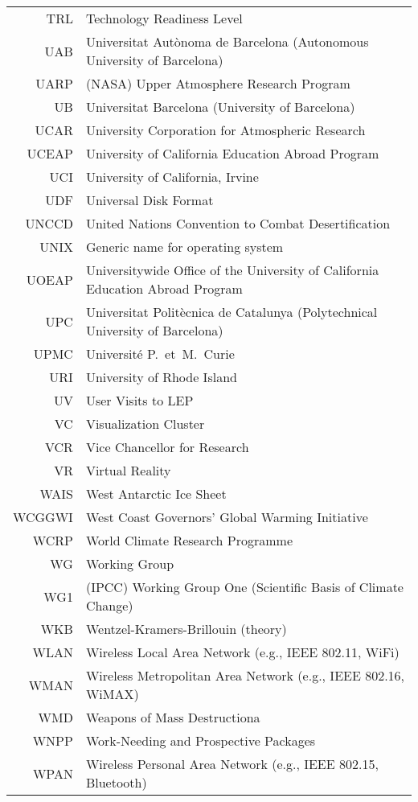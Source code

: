\documentclass[12pt,twoside]{article}
\begin{document}
\begin{longtable}[>{\bfseries}l]{>{\ttfamily}r l}
TRL & Technology Readiness Level \\
UAB & Universitat Aut\`{o}noma de Barcelona (Autonomous University of Barcelona) \\
UARP & (NASA) Upper Atmosphere Research Program \\
UB & Universitat Barcelona (University of Barcelona) \\
UCAR & University Corporation for Atmospheric Research \\
UCEAP & University of California Education Abroad Program \\
UCI & University of California, Irvine \\
UDF & Universal Disk Format \\
UNCCD & United Nations Convention to Combat Desertification \\
UNIX & Generic name for operating system \\
UOEAP & Universitywide Office of the University of California Education Abroad Program \\
UPC & Universitat Polit\`{e}cnica de Catalunya (Polytechnical University of Barcelona) \\
UPMC & Universit\'{e} P.~et~M.\ Curie \\
URI & University of Rhode Island \\
UV & User Visits to LEP \\
VC & Visualization Cluster \\
VCR & Vice Chancellor for Research \\
VR & Virtual Reality \\
WAIS & West Antarctic Ice Sheet \\
WCGGWI & West Coast Governors' Global Warming Initiative \\
WCRP & World Climate Research Programme \\
WG & Working Group \\
WG1 & (IPCC) Working Group One (Scientific Basis of Climate Change) \\
WKB & Wentzel-Kramers-Brillouin (theory) \\
WLAN & Wireless Local Area Network (e.g., IEEE 802.11, WiFi) \\
WMAN & Wireless Metropolitan Area Network (e.g., IEEE 802.16, WiMAX) \\
WMD & Weapons of Mass Destructiona \\
WNPP & Work-Needing and Prospective Packages \\
WPAN & Wireless Personal Area Network (e.g., IEEE 802.15, Bluetooth) \\

\end{longtable}
\end{document}
